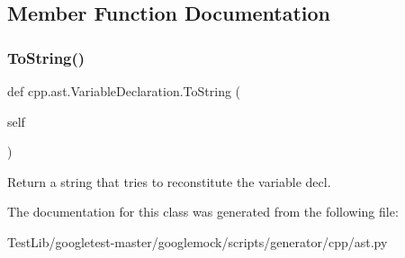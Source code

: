 \subsection{Member Function Documentation}
\mbox{\label{classcpp_1_1ast_1_1VariableDeclaration_a047aa4afddf7b7823a4095cea9477a21}} 
\subsubsection{\texorpdfstring{To\+String()}{ToString()}}
{\footnotesize\ttfamily def cpp.\+ast.\+Variable\+Declaration.\+To\+String (\begin{DoxyParamCaption}\item[{}]{self }\end{DoxyParamCaption})}

\begin{DoxyVerb}Return a string that tries to reconstitute the variable decl.\end{DoxyVerb}
 

The documentation for this class was generated from the following file\+:\begin{DoxyCompactItemize}
\item 
Test\+Lib/googletest-\/master/googlemock/scripts/generator/cpp/ast.\+py\end{DoxyCompactItemize}
